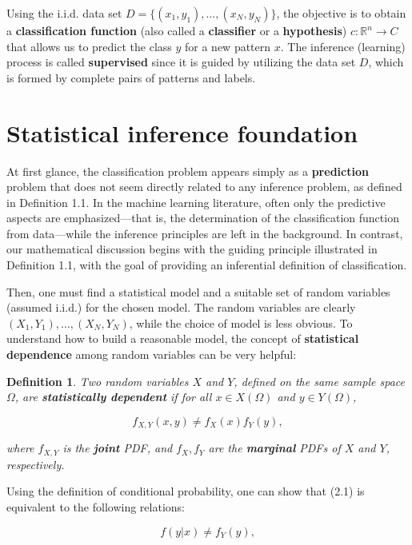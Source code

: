 \documentclass{report}
\newtheorem{definition}{Definition}[chapter]
\begin{document}
Using the i.i.d. data set $D = \{(x_1,y_1),\dots,(x_N,y_N)\}$, the objective is to obtain a \textbf{classification function} (also called a \textbf{classifier} or a \textbf{hypothesis}) $c : \mathbb{R}^n \to C$ that allows us to predict the class $y$ for a new pattern $x$. The inference (learning) process is called \textbf{supervised} since it is guided by utilizing the data set $D$, which is formed by complete pairs of patterns and labels.

\section{Statistical inference foundation}
At first glance, the classification problem appears simply as a \textbf{prediction} problem that does not seem directly related to any inference problem, as defined in Definition 1.1. In the machine learning literature, often only the predictive aspects are emphasized—that is, the determination of the classification function from data—while the inference principles are left in the background. In contrast, our mathematical discussion begins with the guiding principle illustrated in Definition 1.1, with the goal of providing an inferential definition of classification.

Then, one must find a statistical model and a suitable set of random variables (assumed i.i.d.) for the chosen model. The random variables are clearly $(X_1,Y_1),\dots,(X_N,Y_N)$, while the choice of model is less obvious. To understand how to build a reasonable model, the concept of \textbf{statistical dependence} among random variables can be very helpful:

\begin{definition}
Two random variables $X$ and $Y$, defined on the same sample space $\Omega$, are \textbf{statistically dependent} if for all $x\in X(\Omega)$ and $y \in Y(\Omega)$,

\begin{equation}
f_{X,Y}(x,y) \neq f_X(x)f_Y(y),
\end{equation}

where $f_{X,Y}$ is the \textbf{joint} PDF, and $f_X,f_Y$ are the \textbf{marginal} PDFs of $X$ and $Y$, respectively.
\end{definition}

Using the definition of conditional probability, one can show that (2.1) is equivalent to the following relations:

\begin{equation}
f(y|x) \neq f_Y(y),
\end{equation}
\end{document}
